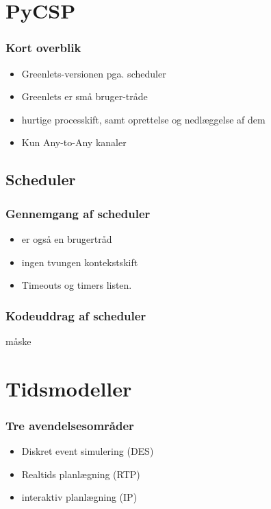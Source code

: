 \documentclass[12pt]{beamer}
\begin{document}
\section{PyCSP}
\begin{frame}		
  \frametitle{Kort overblik}
  \begin{itemize}
	\item Greenlets-versionen pga. scheduler
	\item Greenlets er små bruger-tråde
	\item hurtige processkift, samt oprettelse og nedlæggelse af dem
	\item Kun Any-to-Any kanaler
  \end{itemize}
\end{frame}

\subsection{Scheduler}
\begin{frame}
  \frametitle{Gennemgang af scheduler}
  \begin{itemize}
	\item er også en brugertråd
	\item ingen tvungen kontekstskift
	\item Timeouts og timers listen.
  \end{itemize}
\end{frame}

\begin{frame}
  \frametitle{Kodeuddrag af scheduler}
måske
\end{frame}


\section{Tidsmodeller}
\begin{frame}
	\frametitle{Tre avendelsesområder}
	\begin{itemize}
		\item Diskret event simulering (DES)
		\item Realtids planlægning (RTP)
		\item interaktiv planlægning (IP)
	\end{itemize}
\end{frame}
\end{document}
